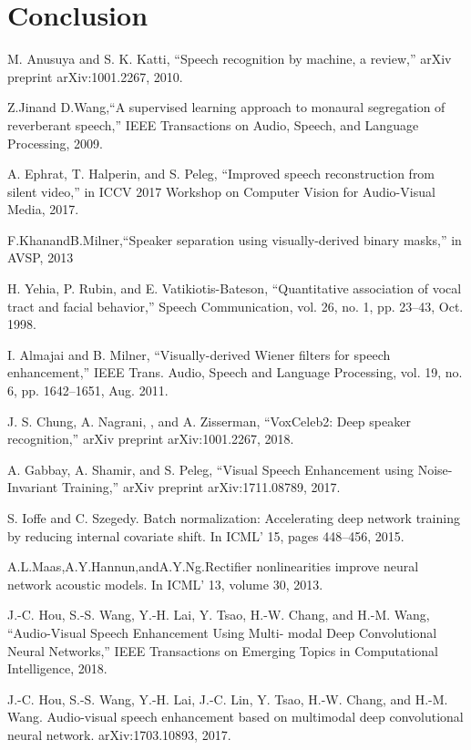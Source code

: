 \documentclass[runningheads,a4paper]{llncs}
\begin{document}
\section{Conclusion}


\begin{thebibliography}{4}

 M. Anusuya and S. K. Katti, “Speech recognition by machine, a review,” arXiv preprint arXiv:1001.2267, 2010.


 Z.Jinand D.Wang,“A supervised learning approach to monaural segregation of reverberant speech,” IEEE Transactions on Audio, Speech, and Language Processing, 2009.


  A. Ephrat, T. Halperin, and S. Peleg, “Improved speech reconstruction from silent video,” in ICCV 2017 Workshop on Computer Vision for Audio-Visual Media, 2017.


 F.KhanandB.Milner,“Speaker separation using visually-derived binary masks,” in AVSP, 2013


  H. Yehia, P. Rubin, and E. Vatikiotis-Bateson, “Quantitative association of vocal tract and facial behavior,” Speech Communication, vol. 26, no. 1, pp. 23–43, Oct. 1998.


 I. Almajai and B. Milner, “Visually-derived Wiener filters for speech enhancement,” IEEE Trans. Audio, Speech and Language Processing, vol. 19, no. 6, pp. 1642–1651, Aug. 2011.


 J. S. Chung, A. Nagrani, , and A. Zisserman, “VoxCeleb2: Deep speaker recognition,” arXiv preprint arXiv:1001.2267, 2018.


 A. Gabbay, A. Shamir, and S. Peleg, “Visual Speech Enhancement using Noise-Invariant Training,” arXiv preprint arXiv:1711.08789, 2017.


 S. Ioffe and C. Szegedy. Batch normalization: Accelerating deep network training by reducing internal covariate shift. In ICML’ 15, pages 448–456, 2015.


 A.L.Maas,A.Y.Hannun,andA.Y.Ng.Rectifier nonlinearities improve neural network acoustic models. In ICML’ 13, volume 30, 2013.


 J.-C. Hou, S.-S. Wang, Y.-H. Lai, Y. Tsao, H.-W. Chang, and H.-M. Wang, “Audio-Visual Speech Enhancement Using Multi- modal Deep Convolutional Neural Networks,” IEEE Transactions on Emerging Topics in Computational Intelligence, 2018.


 J.-C. Hou, S.-S. Wang, Y.-H. Lai, J.-C. Lin, Y. Tsao, H.-W. Chang, and H.-M. Wang. Audio-visual speech enhancement based on multimodal deep convolutional neural network. arXiv:1703.10893, 2017.


\end{thebibliography}
\end{document}
